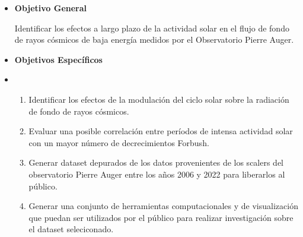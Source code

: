 \newpage


\begin{itemize}
\item \textbf{Objetivo General}

Identificar los efectos a largo plazo de la actividad solar en el flujo de fondo de rayos cósmicos de baja energía medidos por el Observatorio Pierre Auger.

\item \textbf{Objetivos Específicos}
\end{itemize}
\begin{itemize}
\item \begin{enumerate}
    \item Identificar los efectos de la modulación del ciclo solar sobre la radiación de fondo de rayos cósmicos.
    \item Evaluar una posible correlación entre períodos de intensa actividad solar con un mayor número de decrecimientos Forbush.
    \item Generar dataset depurados de los datos provenientes de los scalers del observatorio Pierre Auger entre los años 2006 y 2022 para liberarlos al público.
    \item Generar una conjunto de herramientas computacionales y de visualización que puedan ser utilizados por el público para realizar investigación sobre el dataset seleciconado.
\end{enumerate} 
\end{itemize}

\newpage
